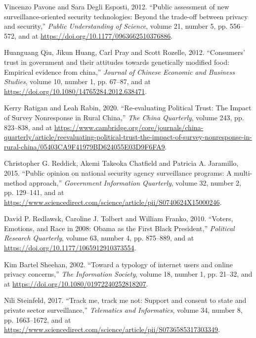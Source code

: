 \documentclass[
  letterpaper,
  DIV=11,
  numbers=noendperiod]{scrartcl}
\newlength{\cslhangindent}
\newenvironment{CSLReferences}[2] %
 {\begin{list}{}{%
  \setlength{\itemindent}{0pt}
  \setlength{\leftmargin}{0pt}
  \setlength{\parsep}{0pt}
  \ifodd #1
   \setlength{\leftmargin}{\cslhangindent}
   \setlength{\itemindent}{-1\cslhangindent}
  \fi
  \setlength{\itemsep}{#2\baselineskip}}}
 {\end{list}}
\begin{document}
\begin{CSLReferences}{1}{1}
Vincenzo Pavone and Sara Degli Esposti, 2012. {``Public assessment of
new surveillance-oriented security technologies: Beyond the trade-off
between privacy and security,''} \emph{Public Understanding of Science},
volume 21, number 5, pp. 556--572, and at
\url{https://doi.org/10.1177/0963662510376886}.

Huanguang Qiu, Jikun Huang, Carl Pray and Scott Rozelle, 2012.
{``Consumers{'} trust in government and their attitudes towards
genetically modified food: Empirical evidence from china,''}
\emph{Journal of Chinese Economic and Business Studies}, volume 10,
number 1, pp. 67--87, and at
\url{https://doi.org/10.1080/14765284.2012.638471}.

Kerry Ratigan and Leah Rabin, 2020. {``Re-evaluating Political Trust:
The Impact of Survey Nonresponse in Rural China,''} \emph{The China
Quarterly}, volume 243, pp. 823--838, and at
\url{https://www.cambridge.org/core/journals/china-quarterly/article/reevaluating-political-trust-the-impact-of-survey-nonresponse-in-rural-china/05403CA9F41979BD624055E03D9F6FA9}.

Christopher G. Reddick, Akemi Takeoka Chatfield and Patricia A.
Jaramillo, 2015. {``Public opinion on national security agency
surveillance programs: A multi-method approach,''} \emph{Government
Information Quarterly}, volume 32, number 2, pp. 129--141, and at
\url{https://www.sciencedirect.com/science/article/pii/S0740624X15000246}.

David P. Redlawsk, Caroline J. Tolbert and William Franko, 2010.
{``Voters, Emotions, and Race in 2008: Obama as the First Black
President,''} \emph{Political Research Quarterly}, volume 63, number 4,
pp. 875--889, and at \url{https://doi.org/10.1177/1065912910373554}.

Kim Bartel Sheehan, 2002. {``Toward a typology of internet users and
online privacy concerns,''} \emph{The Information Society}, volume 18,
number 1, pp. 21--32, and at
\url{https://doi.org/10.1080/01972240252818207}.

Nili Steinfeld, 2017. {``Track me, track me not: Support and consent to
state and private sector surveillance,''} \emph{Telematics and
Informatics}, volume 34, number 8, pp. 1663--1672, and at
\url{https://www.sciencedirect.com/science/article/pii/S0736585317303349}.


\end{CSLReferences}
\end{document}
